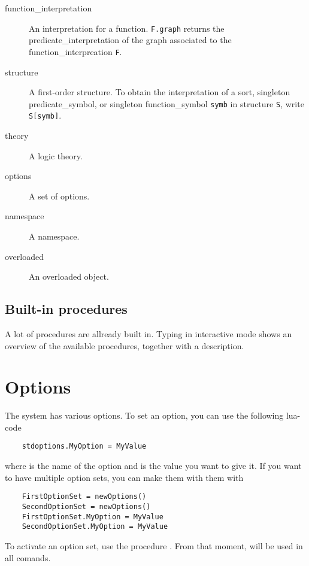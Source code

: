 \documentclass[a4]{article}
\begin{document}
\begin{description}
	\item[function\_interpretation] An interpretation for a function. {\tt F.graph} returns the predicate\_interpretation of the graph associated to the function\_interpreation {\tt F}. %
	\item[structure] A first-order structure. To obtain the interpretation of a sort, singleton predicate\_symbol, or singleton function\_symbol {\tt symb} in structure {\tt S}, write {\tt S[symb]}.
	\item[theory] A logic theory.
	\item[options] A set of options.
	\item[namespace] A namespace.
	\item[overloaded] An overloaded object.
\end{description}


\subsection{Built-in procedures}

A lot of procedures are allready built in.  Typing  in interactive mode shows an overview of the available procedures, together with a description.  





\section{Options}
The \idp system has various options.  To set an option, you can use the following lua-code
\begin{lstlisting}
	stdoptions.MyOption = MyValue
\end{lstlisting}
where  is the name of the option and  is the value you want to give it. If you want to have multiple option sets, you can make them with them with
\begin{lstlisting}
	FirstOptionSet = newOptions()
	SecondOptionSet = newOptions()
	FirstOptionSet.MyOption = MyValue
	SecondOptionSet.MyOption = MyValue
\end{lstlisting}
To activate an option set, use the procedure .  From that moment,  will be used in all comands.
\end{document}
